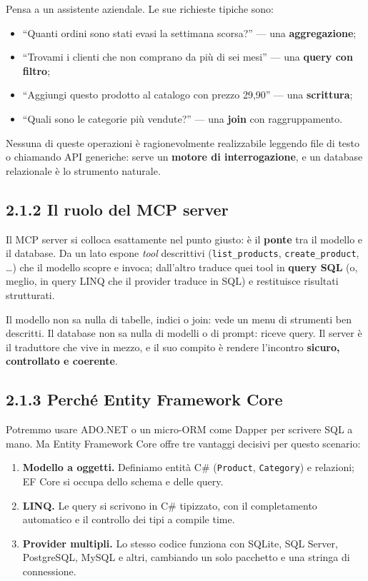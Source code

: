\documentclass[
  italian,
  10pt,
]{book}
\providecommand{\tightlist}{%
  \setlength{\itemsep}{0pt}\setlength{\parskip}{0pt}}
\begin{document}
Pensa a un assistente aziendale. Le sue richieste tipiche sono:

\begin{itemize}
\tightlist
\item
  ``Quanti ordini sono stati evasi la settimana scorsa?'' --- una
  \textbf{aggregazione};
\item
  ``Trovami i clienti che non comprano da più di sei mesi'' --- una
  \textbf{query con filtro};
\item
  ``Aggiungi questo prodotto al catalogo con prezzo 29,90'' --- una
  \textbf{scrittura};
\item
  ``Quali sono le categorie più vendute?'' --- una \textbf{join} con
  raggruppamento.
\end{itemize}

Nessuna di queste operazioni è ragionevolmente realizzabile leggendo
file di testo o chiamando API generiche: serve un \textbf{motore di
interrogazione}, e un database relazionale è lo strumento naturale.

\subsection{2.1.2 Il ruolo del MCP
server}\label{il-ruolo-del-mcp-server}

Il MCP server si colloca esattamente nel punto giusto: è il
\textbf{ponte} tra il modello e il database. Da un lato espone
\emph{tool} descrittivi (\texttt{list\_products},
\texttt{create\_product}, \ldots) che il modello scopre e invoca;
dall'altro traduce quei tool in \textbf{query SQL} (o, meglio, in query
LINQ che il provider traduce in SQL) e restituisce risultati
strutturati.

Il modello non sa nulla di tabelle, indici o join: vede un menu di
strumenti ben descritti. Il database non sa nulla di modelli o di
prompt: riceve query. Il server è il traduttore che vive in mezzo, e il
suo compito è rendere l'incontro \textbf{sicuro, controllato e
coerente}.

\subsection{2.1.3 Perché Entity Framework
Core}\label{perchuxe9-entity-framework-core}

Potremmo usare ADO.NET o un micro-ORM come Dapper per scrivere SQL a
mano. Ma Entity Framework Core offre tre vantaggi decisivi per questo
scenario:

\begin{enumerate}
\def\labelenumi{\arabic{enumi}.}
\tightlist
\item
  \textbf{Modello a oggetti.} Definiamo entità C\# (\texttt{Product},
  \texttt{Category}) e relazioni; EF Core si occupa dello schema e delle
  query.
\item
  \textbf{LINQ.} Le query si scrivono in C\# tipizzato, con il
  completamento automatico e il controllo dei tipi a compile time.
\item
  \textbf{Provider multipli.} Lo stesso codice funziona con SQLite, SQL
  Server, PostgreSQL, MySQL e altri, cambiando un solo pacchetto e una
  stringa di connessione.
\end{enumerate}
\end{document}
